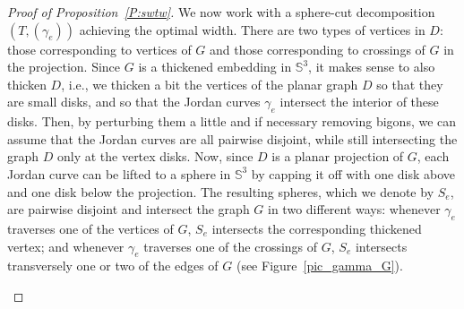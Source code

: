 \documentclass[11pt,a4paper]{article}
\newcommand{\Sp}{\mathbb S}
\begin{document}
\begin{proof}[Proof of Proposition~\ref{P:swtw}]
  We now work with a sphere-cut decomposition $(T,(\gamma_e))$ achieving the optimal width. There are two types of vertices in $D$: those corresponding to vertices of $G$ and those corresponding to crossings of $G$ in the projection. Since $G$ is a thickened embedding in $\Sp^3$, it makes sense to also thicken $D$, i.e., we thicken a bit the vertices of the planar graph $D$ so that they are small disks, and so that the Jordan curves $\gamma_e$ intersect the interior of these disks. Then, by perturbing them a little and if necessary removing bigons, we can assume that the Jordan curves are all pairwise disjoint, while still intersecting the graph $D$ only at the vertex disks. Now, since $D$ is a planar projection of $G$, each Jordan curve can be lifted to a sphere in $\Sp^3$ by capping it off with one disk above and one disk below the projection. The resulting spheres, which we denote by $S_e$, are pairwise disjoint and intersect the graph $G$ in two different ways: whenever $\gamma_e$ traverses one of the vertices of $G$, $S_e$ intersects the corresponding thickened vertex; and whenever $\gamma_e$ traverses one of the crossings of $G$, $S_e$ intersects transversely one or two of the edges of $G$ (see Figure~\ref{pic_gamma_G}). 
\begin{figure}[h]
\begin{center}
\end{center}
\end{figure}
\end{proof}
\end{document}
